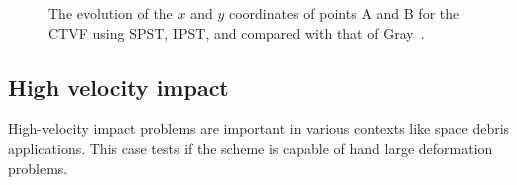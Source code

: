 \begin{figure}
\begin{subfigure}{0.48\textwidth}
    \label{fig:rings-compare-y}
  \end{subfigure}
  \caption{The evolution of the $x$ and $y$ coordinates of points A and B for
    the CTVF using SPST, IPST, and compared with that of
    Gray~\citep{gray-ed-2001}.}
\label{fig:rings_compare}
\end{figure}


\FloatBarrier%
\subsection{High velocity impact}

High-velocity impact problems are important in various contexts like space
debris applications. This case tests if the scheme is capable of hand large
deformation problems.


